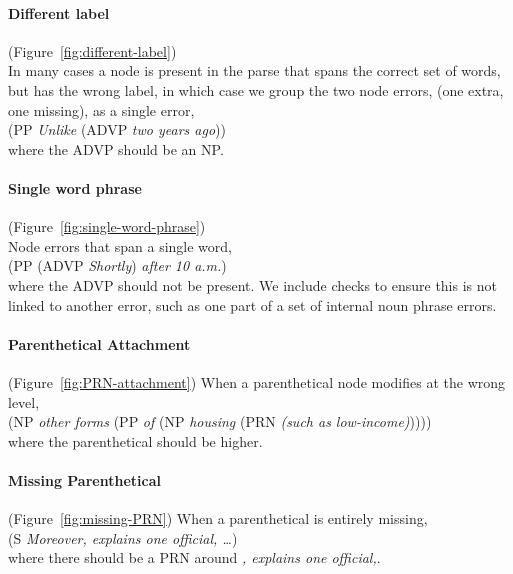 \begin{figure}
\hfill
\begin{minipage}[b]{2.5in}
\centering

\end{minipage}\hfill
\begin{minipage}[b]{3.5in}
\centering

\end{minipage}\hfill
\end{figure}

\paragraph{Different label} (Figure~\ref{fig:different-label}) \\
In many cases a node is present in the parse that spans the correct set of words, but has the wrong label, in which case we group the two node errors, (one extra, one missing), as a single error, \myeg \\
(PP \emph{Unlike} (ADVP \emph{two years ago})) \\
where the ADVP should be an NP.

\paragraph{Single word phrase} (Figure~\ref{fig:single-word-phrase}) \\
Node errors that span a single word, \myeg \\
(PP (ADVP \emph{Shortly}) \emph{after 10 a.m.\@\xspace}) \\
where the ADVP should not be present.
We include checks to ensure this is not linked to another error, such as one part of a set of internal noun phrase errors.

\paragraph{Parenthetical Attachment} (Figure~\ref{fig:PRN-attachment})
When a parenthetical node modifies at the wrong level, \myeg \\
(NP \emph{other forms} (PP \emph{of} (NP \emph{housing} (PRN \emph{(such as low-income)})))) \\
where the parenthetical should be higher.

\paragraph{Missing Parenthetical} (Figure~\ref{fig:missing-PRN})
When a parenthetical is entirely missing, \myeg \\
(S \emph{Moreover, explains one official, \ldots}) \\
where there should be a PRN around \emph{, explains one official,}.

